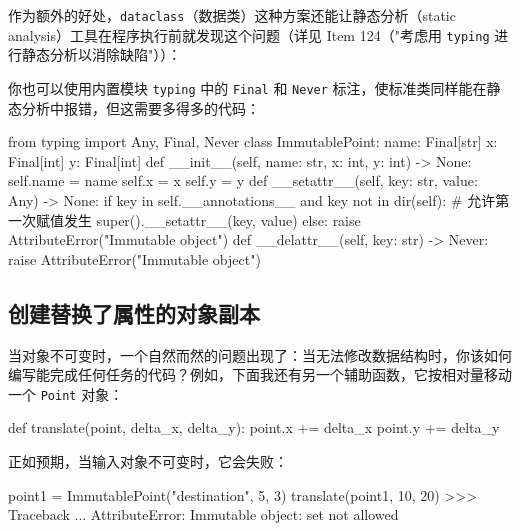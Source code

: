 作为额外的好处，\texttt{dataclass}（数据类）这种方案还能让静态分析（static analysis）工具在程序执行前就发现这个问题（详见 Item 124（"考虑用 \texttt{typing} 进行静态分析以消除缺陷"））：


你也可以使用内置模块 \texttt{typing} 中的 \texttt{Final} 和 \texttt{Never} 标注，使标准类同样能在静态分析中报错，但这需要多得多的代码：

\begin{codebox}[python]
from typing import Any, Final, Never
class ImmutablePoint:
    name: Final[str]
    x: Final[int]
    y: Final[int]
    def __init__(self, name: str, x: int, y: int) -> None:
        self.name = name
        self.x = x
        self.y = y
    def __setattr__(self, key: str, value: Any) -> None:
        if key in self.__annotations__ and key not in dir(self):
            # 允许第一次赋值发生
            super().__setattr__(key, value)
        else:
            raise AttributeError("Immutable object")
    def __delattr__(self, key: str) -> Never:
        raise AttributeError("Immutable object")
\end{codebox}

\subsection{创建替换了属性的对象副本}

当对象不可变时，一个自然而然的问题出现了：当无法修改数据结构时，你该如何编写能完成任何任务的代码？例如，下面我还有另一个辅助函数，它按相对量移动一个 \texttt{Point} 对象：

\begin{codebox}[python]
def translate(point, delta_x, delta_y):
    point.x += delta_x
    point.y += delta_y
\end{codebox}

正如预期，当输入对象不可变时，它会失败：

\begin{codebox}[python]
point1 = ImmutablePoint("destination", 5, 3)
translate(point1, 10, 20)
>>>
Traceback ...
AttributeError: Immutable object: set not allowed
\end{codebox}


